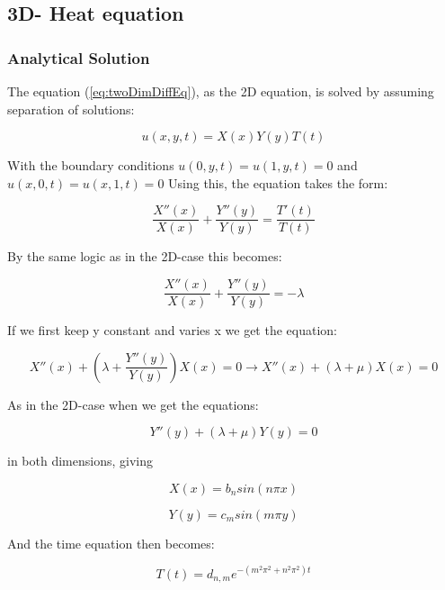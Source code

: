 \documentclass[a4paper,10pt]{article}
\begin{document}
\subsection{3D- Heat equation}
\subsubsection{Analytical Solution}
The equation (\ref{eq:twoDimDiffEq}), as the 2D equation, is solved by assuming separation of solutions:

\begin{equation}
 u(x,y,t) = X(x)Y(y)T(t)
\end{equation}

With the boundary conditions $u(0,y,t) = u(1,y,t) = 0$ and $u(x,0,t) = u(x,1,t) = 0$
Using this, the equation takes the form:

\begin{equation}
 \frac{X''(x)}{X(x)} + \frac{Y''(y)}{Y(y)} = \frac{T'(t)}{T(t)} 
\end{equation}

By the same logic as in the 2D-case this becomes:

\begin{equation}
 \frac{X''(x)}{X(x)} + \frac{Y''(y)}{Y(y)} = -\lambda
\end{equation}

If we first keep y constant and varies x we get the equation:

\begin{equation}
 X''(x) + (\lambda + \frac{Y''(y)}{Y(y)})X(x) = 0 \rightarrow X''(x) + (\lambda + \mu)X(x) = 0
\end{equation}

As in the 2D-case when we get the equations:

\begin{equation}
 Y''(y) + (\lambda + \mu)Y(y) = 0
\end{equation}

in both dimensions, giving

\begin{equation}
 X(x) = b_nsin(n\pi x)
\end{equation}

\begin{equation}
 Y(y) = c_msin(m\pi y)
\end{equation}

And the time equation then becomes:

\begin{equation}
 T(t) = d_{n,m}e^{-(m^2\pi^2 + n^2\pi^2)t}
\end{equation}
\end{document}
